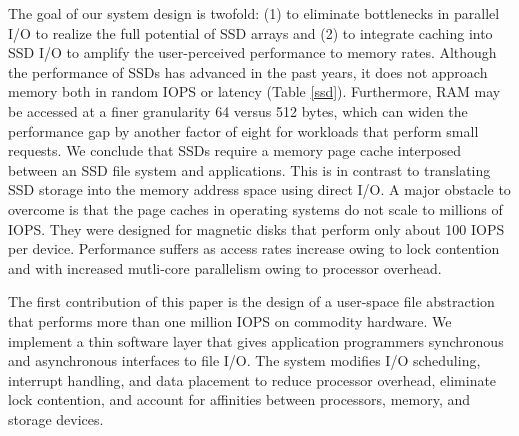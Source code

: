 The goal of our system design is twofold: (1) to eliminate bottlenecks in parallel I/O 
to realize the full potential of SSD arrays and (2) to integrate caching into SSD I/O to amplify the 
user-perceived performance to memory rates.  
Although the performance of SSDs has advanced in the past years, it
does not approach memory both in random IOPS or latency (Table \ref{ssd}). 
Furthermore, RAM may be accessed at a finer granularity 64 versus 512 bytes, which can widen the performance gap 
by another factor of eight for workloads that perform small requests.
We conclude that SSDs require a memory page cache interposed between an SSD file system and applications.
This is in contrast to translating SSD storage into the memory address space using direct I/O. %
A major obstacle to overcome is that the page caches in operating systems do not scale to millions of IOPS.
They were designed for magnetic disks that perform only about 100 IOPS per device.
Performance suffers as access rates increase owing to lock contention 
and with increased mutli-core parallelism owing to processor overhead.






The first contribution of this paper is the design of a user-space file abstraction that
performs more than one million IOPS on commodity hardware.   We implement a thin software
layer that gives application programmers synchronous and asynchronous interfaces to 
file I/O.  The system modifies I/O scheduling, interrupt handling, and data placement
to reduce processor overhead, eliminate lock contention, 
and account for affinities between processors, memory, and storage devices.

